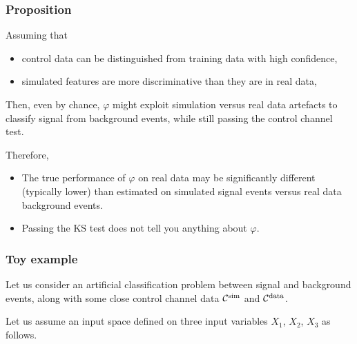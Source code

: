 \documentclass{beamer}
\begin{document}
\begin{frame}
  \frametitle{Proposition}

Assuming that
\begin{itemize}
\item control data can be distinguished from training data with high confidence,
\item simulated features are more discriminative than they are in real data,
\end{itemize}

Then, even by chance, $\varphi$ might exploit simulation versus real data
artefacts to classify signal from background events, {\color{red}while still passing the
control channel test}.

\vspace{0.5cm}

Therefore,

\begin{itemize}

\item The true performance of $\varphi$ on real data may be significantly different
(typically lower) than estimated on simulated signal events versus real data
background events.

\item Passing the KS test does not tell you anything about $\varphi$.

\end{itemize}

\end{frame}

\begin{frame}
  \frametitle{Toy example}

Let us consider an artificial classification
problem between signal and background events, along with some close control
channel data ${\cal C}^\text{sim}$ and ${\cal C}^\text{data}$.

\vspace{0.5cm}

Let us assume an
input space defined on three input variables $X_1$, $X_2$, $X_3$ as follows.

\end{frame}
\end{document}

